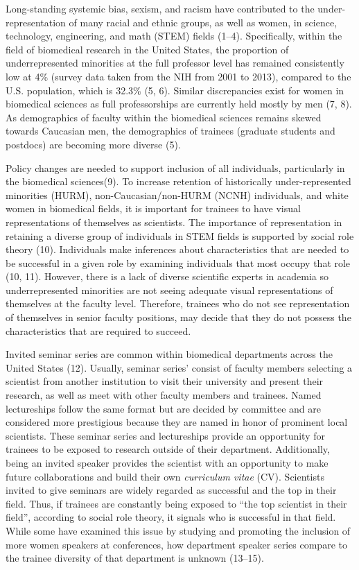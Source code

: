 \documentclass[10pt,]{article}
\begin{document}
Long-standing systemic bias, sexism, and racism have contributed to the
under-representation of many racial and ethnic groups, as well as women,
in science, technology, engineering, and math (STEM) fields (1--4).
Specifically, within the field of biomedical research in the United
States, the proportion of underrepresented minorities at the full
professor level has remained consistently low at 4\% (survey data taken
from the NIH from 2001 to 2013), compared to the U.S. population, which
is 32.3\% (5, 6). Similar discrepancies exist for women in biomedical
sciences as full professorships are currently held mostly by men (7, 8).
As demographics of faculty within the biomedical sciences remains skewed
towards Caucasian men, the demographics of trainees (graduate students
and postdocs) are becoming more diverse (5).

Policy changes are needed to support inclusion of all individuals,
particularly in the biomedical sciences(9). To increase retention of
historically under-represented minorities (HURM), non-Caucasian/non-HURM
(NCNH) individuals, and white women in biomedical fields, it is
important for trainees to have visual representations of themselves as
scientists. The importance of representation in retaining a diverse
group of individuals in STEM fields is supported by social role theory
(10). Individuals make inferences about characteristics that are needed
to be successful in a given role by examining individuals that most
occupy that role (10, 11). However, there is a lack of diverse
scientific experts in academia so underrepresented minorities are not
seeing adequate visual representations of themselves at the faculty
level. Therefore, trainees who do not see representation of themselves
in senior faculty positions, may decide that they do not possess the
characteristics that are required to succeed.

Invited seminar series are common within biomedical departments across
the United States (12). Usually, seminar series' consist of faculty
members selecting a scientist from another institution to visit their
university and present their research, as well as meet with other
faculty members and trainees. Named lectureships follow the same format
but are decided by committee and are considered more prestigious because
they are named in honor of prominent local scientists. These seminar
series and lectureships provide an opportunity for trainees to be
exposed to research outside of their department. Additionally, being an
invited speaker provides the scientist with an opportunity to make
future collaborations and build their own \emph{curriculum vitae} (CV).
Scientists invited to give seminars are widely regarded as successful
and the top in their field. Thus, if trainees are constantly being
exposed to ``the top scientist in their field'', according to social
role theory, it signals who is successful in that field. While some have
examined this issue by studying and promoting the inclusion of more
women speakers at conferences, how department speaker series compare to
the trainee diversity of that department is unknown (13--15).
\end{document}
